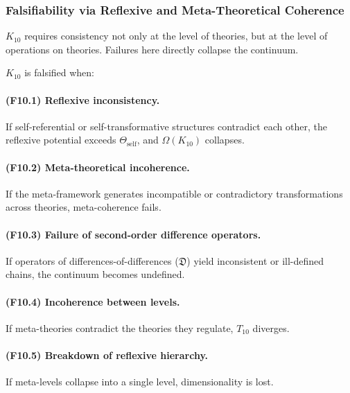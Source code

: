 \subsubsection{Falsifiability via Reflexive and Meta-Theoretical Coherence}

$K_{10}$ requires consistency not only at the level of theories, but at the
level of operations on theories. Failures here directly collapse the continuum.

$K_{10}$ is falsified when:

\paragraph{(F10.1) Reflexive inconsistency.}
If self-referential or self-transformative structures
contradict each other, the reflexive potential exceeds
$\Theta_{\mathrm{self}}$, and $\Omega(K_{10})$ collapses.

\paragraph{(F10.2) Meta-theoretical incoherence.}
If the meta-framework generates incompatible or contradictory
transformations across theories, meta-coherence fails.

\paragraph{(F10.3) Failure of second-order difference operators.}
If operators of differences-of-differences ($\mathfrak{D}$)
yield inconsistent or ill-defined chains,
the continuum becomes undefined.

\paragraph{(F10.4) Incoherence between levels.}
If meta-theories contradict the theories they regulate,
$T_{10}$ diverges.

\paragraph{(F10.5) Breakdown of reflexive hierarchy.}
If meta-levels collapse into a single level,
dimensionality is lost.



